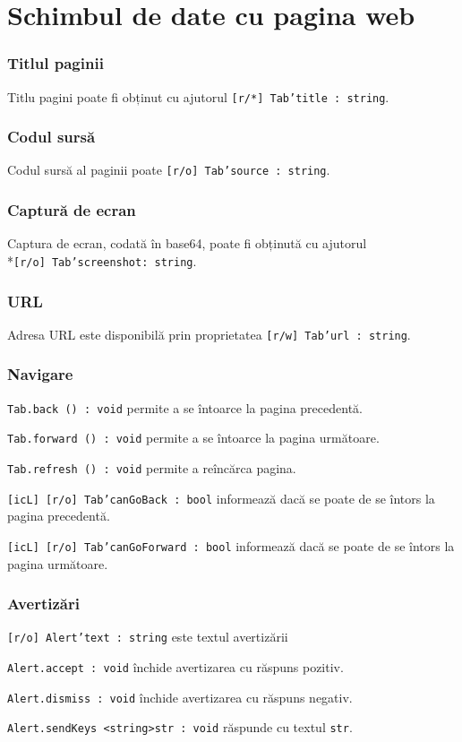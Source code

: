 \section{Schimbul de date cu pagina web}
\label{dataexchange}

\subsubsection{Titlul paginii}

Titlu pagini poate fi obținut cu ajutorul \texttt{[r/*] Tab'title : string}.

\subsubsection{Codul sursă}

Codul sursă al paginii poate \texttt{[r/o] Tab'source : string}.

\subsubsection{Captură de ecran}

Captura de ecran, codată în base64, poate fi obținută cu ajutorul \\*\texttt{[r/o] Tab'screenshot: string}.

\subsubsection{URL}

Adresa URL este disponibilă prin proprietatea \texttt{[r/w] Tab'url : string}.

\subsubsection{Navigare}

\texttt{Tab.back () : void} permite a se întoarce la pagina precedentă.

\texttt{Tab.forward () : void} permite a se întoarce la pagina următoare.

\texttt{Tab.refresh () : void}  permite a reîncărca pagina.

\texttt{[icL] [r/o] Tab'canGoBack : bool} informează dacă se poate de se întors la pagina precedentă.

\texttt{[icL] [r/o] Tab'canGoForward : bool} informează dacă se poate de se întors la pagina următoare.


\subsubsection{Avertizări}

\texttt{[r/o] Alert'text : string} este textul avertizării

\texttt{Alert.accept : void} închide avertizarea cu răspuns pozitiv.

\texttt{Alert.dismiss : void} închide avertizarea cu răspuns negativ.

\texttt{Alert.sendKeys <string>str : void} răspunde cu textul \texttt{str}.

